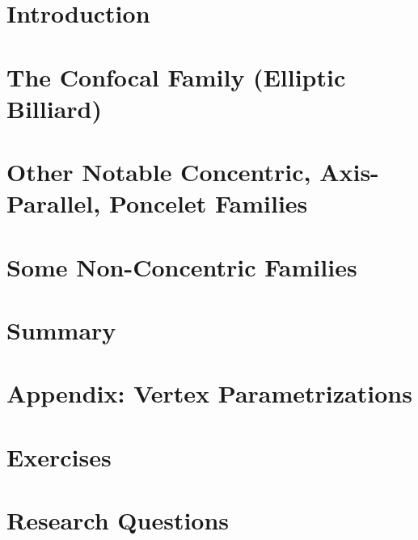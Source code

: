 \section{Introduction}
\label{sec:03-intro}


\section{The Confocal Family (Elliptic Billiard)}
\label{sec:03-billiard}


\section[More concentric Poncelet families]{Other Notable Concentric, Axis-Parallel, Poncelet Families}
\label{sec:03-other-conc}
 
 
\section{Some Non-Concentric Families}
\label{sec:03-non-conc}
 

\section{Summary}
\label{sec:03-summary}


\section{Appendix: Vertex Parametrizations}
\label{sec:03-vtx-param}


\section{Exercises}
\label{sec:03-exercises}


\section{Research Questions}
\label{sec:03-research}

